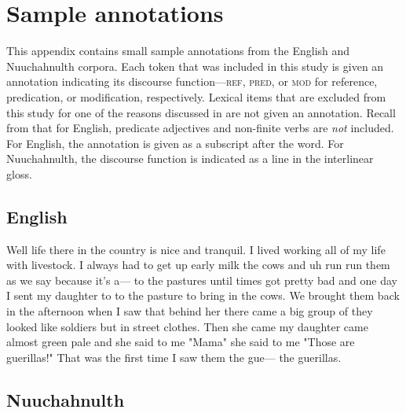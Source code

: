 \chapter{Sample annotations}
\label{app:sample-annotations}

This appendix contains small sample annotations from the English and Nuuchahnulth corpora. Each token that was included in this study is given an annotation indicating its discourse function—\textsc{ref}, \textsc{pred}, or \textsc{mod} for reference, predication, or modification, respectively. Lexical items that are excluded from this study for one of the reasons discussed in  are not given an annotation. Recall from  that for English, predicate adjectives and non-finite verbs are \emph{not} included. For English, the annotation is given as a subscript after the word. For Nuuchahnulth, the discourse function is indicated as a  line in the interlinear gloss.

\section{English}
\label{app:sample-annotations-English}

\onehalfspacing

Well life there in the country is nice and tranquil. I lived working all of my life with livestock. I always had to get up early milk the cows and uh run run them as we say because it's a— to the pastures until times got pretty bad and one day I sent my daughter to to the pasture to bring in the cows. We brought them back in the afternoon when I saw that behind her there came a big group of they looked like soldiers but in street clothes. Then she came my daughter came almost green pale and she said to me "Mama" she said to me "Those are guerillas!" That was the first time I saw them the gue— the guerillas. \parencite[ArguetaBertila-ENG]{OANC}

\section{Nuuchahnulth}
\label{app:sample-annotations-Nuuchahnulth}

